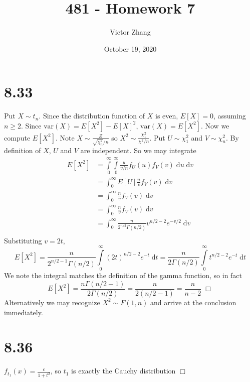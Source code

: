 \documentclass{article}
\title{481 - Homework 7}
\author{Victor Zhang}
\date{October 19, 2020}
\begin{document}
\maketitle

\section*{8.33}
Put $X \sim t_n$. Since the distribution function of $X$ is even, $E[X] = 0$, assuming $n \geq 2$. Since $\mathrm{var}(X) = E[X^2] - E[X]^2$, $\mathrm{var}(X) = E[X^2]$. Now we compute $E[X^2]$. Note $X \sim \frac{Z}{\sqrt{\chi^2_n}/n}$ so $X^2 \sim \frac{\chi^2_1}{\chi^2/n}$. Put $U \sim \chi^2_1$ and $V \sim \chi^2_n$. By definition of $X$, $U$ and $V$ are independent. So we may integrate
\begin{equation*}
\begin{split}
E[X^2] &= \int\limits_0^\infty \int\limits_0^\infty \frac{u}{v/n}f_U(u)f_V(v)\; \mathrm{d}u\; \mathrm{d}v\\
&= \int_0^\infty E[U] \frac{n}{v}f_V(v)\; \mathrm{d}v\\
&= \int_0^\infty \frac{n}{v}f_V(v)\; \mathrm{d}v\\
&= \int_0^\infty \frac{n}{v}f_V(v)\; \mathrm{d}v\\
&= \int_0^\infty \frac{n}{2^{n/2}\Gamma(n/2)}v^{n/2-2}e^{-v/2} \; \mathrm{d}v\\
\end{split}
\end{equation*}
Substituting $v = 2t$,
$$E[X^2] = \frac{n}{2^{n/2-1}\Gamma(n/2)} \int\limits_0^\infty (2t)^{n/2-2}e^{-t}\; \mathrm{d}t = \frac{n}{2\Gamma(n/2)} \int\limits_0^\infty t^{n/2-2}e^{-t}\; \mathrm{d}t$$
We note the integral matches the definition of the gamma function, so in fact
$$E[X^2] = \frac{n\Gamma(n/2 - 1)}{2\Gamma(n/2)} = \frac{n}{2(n/2-1)} = \frac{n}{n-2} \; \Box$$
Alternatively we may recognize $X^2 \sim F(1,n)$ and arrive at the conclusion immediately.

\section*{8.36}
$f_{t_1}(x) = \frac{c}{1+t^2}$, so $t_1$ is exactly the Cauchy distribution $\Box$
\end{document}
